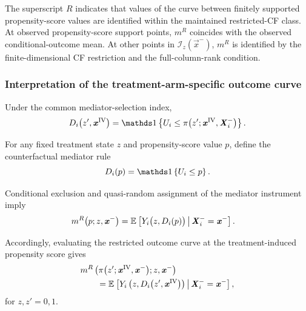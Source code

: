 The superscript $R$ indicates that values of the curve between finitely supported propensity-score values are identified within the maintained restricted-CF class.
At observed propensity-score support points, $m^R$ coincides with the observed conditional-outcome mean.
At other points in $\mathcal I_z(\vec x^-)$, $m^R$ is identified by the finite-dimensional CF restriction and the full-column-rank condition.

\subsubsection{Interpretation of the treatment-arm-specific outcome curve}

Under the common mediator-selection index,
\[
    D_i
    \big(
        z',
        \vec x^{\mathrm{IV}}
    \big)
    =
    \indicator{
        U_i
        \leq
        \pi
        \big(
            z';
            \vec x^{\mathrm{IV}},
            \vec X_i^-
        \big)
    }.
\]

For any fixed treatment state $z$ and propensity-score value $p$, define the counterfactual mediator rule
\[
    D_i(p)
    =
    \indicator{
        U_i\leq p
    }.
\]

Conditional exclusion and quasi-random assignment of the mediator instrument imply
\[
    \begin{aligned}
    m^R
    \big(
        p;
        z,
        \boldsymbol{\mathit{x}}^-
    \big)
    &=
    \mathbb{E}_{} \left[ 
        Y_i
        \big(
            z,D_i(p)
        \big)
     \, \middle\vert \, 
        \boldsymbol{\mathit{X}}_i^-=\boldsymbol{\mathit{x}}^-
     \right].
    \end{aligned}
    \label{eqn:restricted-outcome-policy-interpretation}
\]

Accordingly, evaluating the restricted outcome curve at the treatment-induced propensity score gives
\[
    \begin{aligned}
    &m^R
    \left(
        \pi
        \big(
            z';
            \boldsymbol{\mathit{x}}^{\mathrm{IV}},
            \boldsymbol{\mathit{x}}^-
        \big);
        z,
        \boldsymbol{\mathit{x}}^-
    \right)
    \\
    &\qquad=
    \mathbb{E}_{} \left[ 
        Y_i
        \left(
            z,
            D_i
            \big(
                z',
                \boldsymbol{\mathit{x}}^{\mathrm{IV}}
            \big)
        \right)
     \, \middle\vert \, 
        \boldsymbol{\mathit{X}}_i^-=\boldsymbol{\mathit{x}}^-
     \right],
    \end{aligned}
    \label{eqn:restricted-outcome-endpoint-interpretation}
\]
for $z,z'=0,1$.

